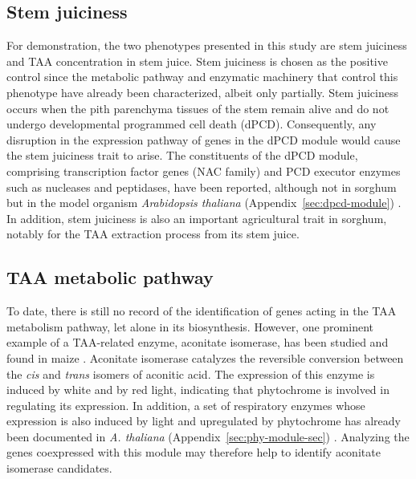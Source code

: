 \subsection{Stem juiciness}
\hspace{1em}For demonstration, the two phenotypes presented in this study are stem juiciness and TAA concentration in stem juice. Stem juiciness is chosen as the positive control since the metabolic pathway and enzymatic machinery that control this phenotype have already been characterized, albeit only partially. Stem juiciness occurs when the pith parenchyma tissues of the stem remain alive and do not undergo developmental programmed cell death (dPCD). Consequently, any disruption in the expression pathway of genes in the dPCD module would cause the stem juiciness trait to arise. The constituents of the dPCD module, comprising transcription factor genes (NAC family) and PCD executor enzymes such as nucleases and peptidases, have been reported, although not in sorghum but in the model organism \textit{Arabidopsis thaliana} (Appendix~\ref{sec:dpcd-module}) \cite{olvera-carrilloConservedCorePCD2015}. In addition, stem juiciness is also an important agricultural trait in sorghum, notably for the TAA extraction process from its stem juice.

\subsection{TAA metabolic pathway}
\hspace{1em}To date, there is still no record of the identification of genes acting in the TAA metabolism pathway, let alone in its biosynthesis. However, one prominent example of a TAA-related enzyme, aconitate isomerase, has been studied and found in maize \cite{eprintsevAconitateIsomeraseMaize2021}. Aconitate isomerase catalyzes the reversible conversion between the \textit{cis} and \textit{trans} isomers of aconitic acid. The expression of this enzyme is induced by white and by red light, indicating that phytochrome is involved in regulating its expression. In addition, a set of respiratory enzymes whose expression is also induced by light and upregulated by phytochrome has already been documented in \textit{A. thaliana} (Appendix~\ref{sec:phy-module-sec}) \cite{igamberdievMitochondriaPhotosyntheticCells2023} \cite{teppermanExpressionProfilingPhyB2004} \cite{escobarLightRegulationArabidopsis2004}. Analyzing the genes coexpressed with this module may therefore help to identify aconitate isomerase candidates.

